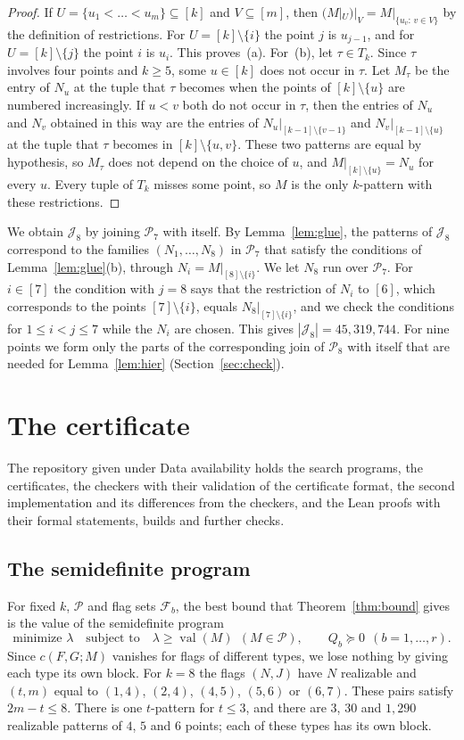 \documentclass[11pt]{amsart}
\theoremstyle{definition}
\theoremstyle{remark}
\numberwithin{equation}{section}
\newcommand{\cP}{\mathcal{P}}
\newcommand{\cF}{\mathcal{F}}
\newcommand{\cJ}{\mathcal{J}}
\newcommand{\val}{\operatorname{val}}
\newcommand{\NPAT}{45{,}319{,}744}
\begin{document}
\begin{proof}
If $U=\{u_1<\dots<u_m\}\subseteq[k]$ and $V\subseteq[m]$, then $(M|_U)|_V=M|_{\{u_v:\,v\in V\}}$ by the definition of restrictions. For $U=[k]\setminus\{i\}$ the point $j$ is $u_{j-1}$, and for $U=[k]\setminus\{j\}$ the point $i$ is $u_i$. This proves~(a). For~(b), let $\tau\in T_k$. Since $\tau$ involves four points and $k\ge5$, some $u\in[k]$ does not occur in $\tau$. Let $M_\tau$ be the entry of $N_u$ at the tuple that $\tau$ becomes when the points of $[k]\setminus\{u\}$ are numbered increasingly. If $u<v$ both do not occur in $\tau$, then the entries of $N_u$ and $N_v$ obtained in this way are the entries of $N_u|_{[k-1]\setminus\{v-1\}}$ and $N_v|_{[k-1]\setminus\{u\}}$ at the tuple that $\tau$ becomes in $[k]\setminus\{u,v\}$. These two patterns are equal by hypothesis, so $M_\tau$ does not depend on the choice of $u$, and $M|_{[k]\setminus\{u\}}=N_u$ for every $u$. Every tuple of $T_k$ misses some point, so $M$ is the only $k$-pattern with these restrictions.
\end{proof}

We obtain $\cJ_8$ by joining $\cP_7$ with itself. By Lemma~\ref{lem:glue}, the patterns of $\cJ_8$ correspond to the families $(N_1,\dots,N_8)$ in $\cP_7$ that satisfy the conditions of Lemma~\ref{lem:glue}(b), through $N_i=M|_{[8]\setminus\{i\}}$. We let $N_8$ run over $\cP_7$. For $i\in[7]$ the condition with $j=8$ says that the restriction of $N_i$ to $[6]$, which corresponds to the points $[7]\setminus\{i\}$, equals $N_8|_{[7]\setminus\{i\}}$, and we check the conditions for $1\le i<j\le7$ while the $N_i$ are chosen. This gives $|\cJ_8|=\NPAT$. For nine points we form only the parts of the corresponding join of $\cP_8$ with itself that are needed for Lemma~\ref{lem:hier} (Section~\ref{sec:check}).

\section{The certificate}\label{sec:cert}

The repository given under Data availability holds the search programs, the certificates, the checkers with their validation of the certificate format, the second implementation and its differences from the checkers, and the Lean proofs with their formal statements, builds and further checks.

\subsection{The semidefinite program}
For fixed $k$, $\cP$ and flag sets $\cF_b$, the best bound that Theorem~\ref{thm:bound} gives is the value of the semidefinite program
\[
\text{minimize }\lambda\quad\text{subject to}\quad\lambda\ge\val(M)\ \ (M\in\cP),\qquad Q_b\succeq0\ \ (b=1,\dots,r).
\]
Since $c(F,G;M)$ vanishes for flags of different types, we lose nothing by giving each type its own block.
For $k=8$ the flags $(N,J)$ have $N$ realizable and $(t,m)$ equal to $(1,4)$, $(2,4)$, $(4,5)$, $(5,6)$ or $(6,7)$. These pairs satisfy $2m-t\le8$. There is one $t$-pattern for $t\le3$, and there are $3$, $30$ and $1{,}290$ realizable patterns of $4$, $5$ and $6$ points; each of these types has its own block.
\end{document}

